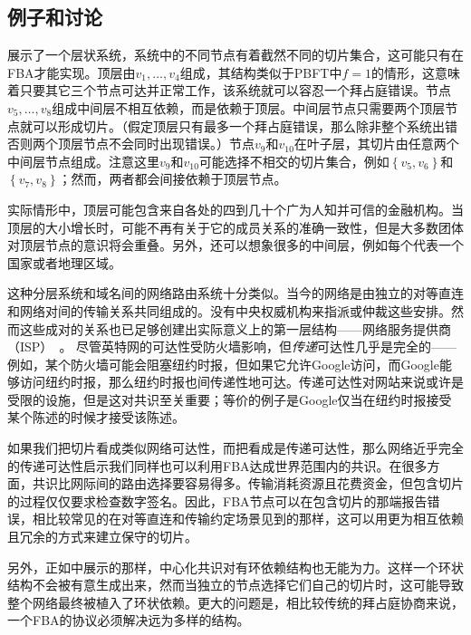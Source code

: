 \subsection{例子和讨论}\label{sec:fba_eg_disscuss}
展示了一个层状系统，系统中的不同节点有着截然不同的切片集合，这可能只有在FBA才能实现。顶层由$v_1,\ldots,v_4$组成，其结构类似于PBFT中$f=1$的情形，这意味着只要其它三个节点可达并正常工作，该系统就可以容忍一个拜占庭错误。节点$v_5,\ldots,v_8$组成中间层不相互依赖，而是依赖于顶层。中间层节点只需要两个顶层节点就可以形成切片。（假定顶层只有最多一个拜占庭错误，那么除非整个系统出错否则两个顶层节点不会同时出现错误。）节点$v_9$和$v_{10}$在叶子层，其切片由任意两个中间层节点组成。注意这里$v_9$和$v_{10}$可能选择不相交的切片集合，例如$\left\{v_5,v_6\right\}$和$\left\{v_7,v_8\right\}$；然而，两者都会间接依赖于顶层节点。

实际情形中，顶层可能包含来自各处的四到几十个广为人知并可信的金融机构。当顶层的大小增长时，可能不再有关于它的成员关系的准确一致性，但是大多数团体对顶层节点的意识将会重叠。另外，还可以想象很多的中间层，例如每个代表一个国家或者地理区域。

这种分层系统和域名间的网络路由系统十分类似。当今的网络是由独立的对等直连和网络对间的传输关系共同组成的。没有中央权威机构来指派或仲裁这些安排。然而这些成对的关系也已足够创建出实际意义上的第一层结构——网络服务提供商（ISP）~\cite{peer_isp2010}。	尽管英特网的可达性受防火墙影响，但\textit{传递}可达性几乎是完全的——例如，某个防火墙可能会阻塞纽约时报，但如果它允许Google访问，而Google能够访问纽约时报，那么纽约时报也间传递性地可达。传递可达性对网站来说或许是受限的设施，但是这对共识至关重要；等价的例子是Google仅当在纽约时报接受某个陈述的时候才接受该陈述。

如果我们把{\quorum}切片看成类似网络可达性，而把{\quorum}看成是传递可达性，那么网络近乎完全的传递可达性启示我们同样也可以利用FBA达成世界范围内的共识。在很多方面，共识比网际间的路由选择要容易得多。传输消耗资源且花费资金，但包含切片的过程仅仅要求检查数字签名。因此，FBA节点可以在包含切片的那端报告错误，相比较常见的在对等直连和传输约定场景见到的那样，这可以用更为相互依赖且冗余的方式来建立保守的切片。

另外，正如中展示的那样，中心化共识对有环依赖结构也无能为力。这样一个环状结构不会被有意生成出来，然而当独立的节点选择它们自己的切片时，这可能导致整个网络最终被植入了环状依赖。更大的问题是，相比较传统的拜占庭协商来说，一个FBA的协议必须解决远为多样的{\quorum}结构。